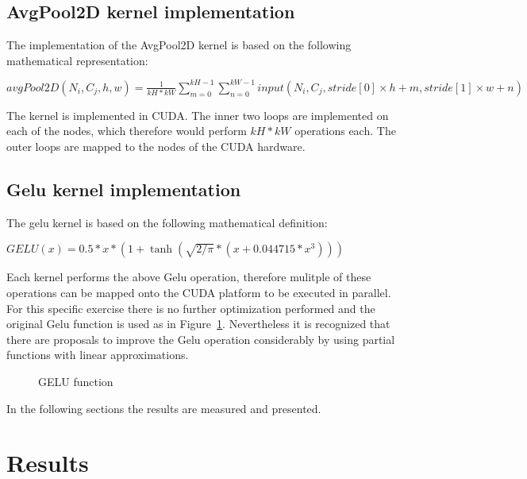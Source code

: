 \documentclass[letterpaper]{article}
\begin{document}
\subsection{AvgPool2D kernel implementation}
The implementation of the AvgPool2D kernel is based on the following mathematical representation:
 
\(avgPool2D(N_i, C_j, h, w)  = \frac{1}{kH * kW} \sum_{m=0}^{kH-1} \sum_{n=0}^{kW-1}
                               input(N_i, C_j, stride[0] \times h + m, stride[1] \times w + n)\)

The kernel is implemented in CUDA. The inner two loops are implemented on each of the nodes, which therefore would perform \(kH *kW\) operations each. The outer loops are mapped to the nodes of the CUDA hardware.  

\subsection{Gelu kernel implementation}

The gelu kernel is based on the following mathematical definition:  

\( GELU(x) = 0.5 * x * (1 + \tanh(\sqrt{2 / \pi} * (x + 0.044715 * x^3)))\)

Each kernel performs the above Gelu operation, therefore mulitple of these operations can be mapped onto the CUDA platform to be executed in parallel. For this specific exercise there is no further optimization performed and the original Gelu function is used as in Figure~\ref{geluFunc}. Nevertheless it is recognized that there are proposals to improve the Gelu operation considerably by using partial functions with linear approximations. 

\begin{figure}
\caption{GELU function}
\label{geluFunc}
\end{figure}

In the following sections the results are measured and presented. 

\section{Results}
\end{document}
